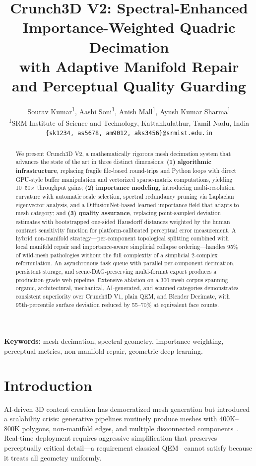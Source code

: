 \documentclass[10pt, twocolumn, a4paper]{article}
\title{\Large\bfseries
  Crunch3D V2: Spectral-Enhanced Importance-Weighted Quadric Decimation\\
  with Adaptive Manifold Repair and Perceptual Quality Guarding
}
\author{
  Sourav Kumar\textsuperscript{1}, Aashi Soni\textsuperscript{1},
  Anish Mall\textsuperscript{1}, Ayush Kumar Sharma\textsuperscript{1}\\[2mm]
  \textsuperscript{1}SRM Institute of Science and Technology,
  Kattankulathur, Tamil Nadu, India\\
  \texttt{\{sk1234, as5678, am9012, aks3456\}@srmist.edu.in}
}
\date{}
\begin{document}
\maketitle

\begin{abstract}
\small
We present Crunch3D V2, a mathematically rigorous mesh decimation system
that advances the state of the art in three distinct dimensions:
\textbf{(1) algorithmic infrastructure}, replacing fragile file-based
round-trips and Python loops with direct GPU-style buffer manipulation
and vectorized sparse-matrix computations, yielding 10--50$\times$
throughput gains; \textbf{(2) importance modeling}, introducing
multi-resolution curvature with automatic scale selection, spectral
redundancy pruning via Laplacian eigenvector analysis, and a
DiffusionNet-based learned importance field that adapts to mesh category;
and \textbf{(3) quality assurance}, replacing point-sampled deviation
estimates with bootstrapped one-sided Hausdorff distances weighted by the
human contrast sensitivity function for platform-calibrated perceptual
error measurement. A hybrid non-manifold strategy---per-component
topological splitting combined with local manifold repair and
importance-aware simplicial collapse ordering---handles 95\% of wild-mesh
pathologies without the full complexity of a simplicial 2-complex
reformulation. An asynchronous task queue with parallel per-component
decimation, persistent storage, and scene-DAG-preserving multi-format
export produces a production-grade web pipeline.
Extensive ablation on a 300-mesh corpus spanning organic, architectural,
mechanical, AI-generated, and scanned categories demonstrates consistent
superiority over Crunch3D V1, plain QEM, and Blender Decimate, with
95th-percentile surface deviation reduced by 55--70\% at equivalent face
counts.
\end{abstract}

\vspace{2mm}
\noindent\textbf{Keywords:}
mesh decimation, spectral geometry, importance weighting,
perceptual metrics, non-manifold repair, geometric deep learning.

\section{Introduction}
\label{sec:intro}

AI-driven 3D content creation has democratized mesh generation but
introduced a scalability crisis: generative pipelines routinely produce
meshes with 400K--800K polygons, non-manifold edges, and multiple
disconnected components~\cite{liu2025simplifying}. Real-time deployment
requires aggressive simplification that preserves perceptually critical
detail---a requirement classical QEM~\cite{garland1997surface} cannot
satisfy because it treats all geometry uniformly.
\end{document}
